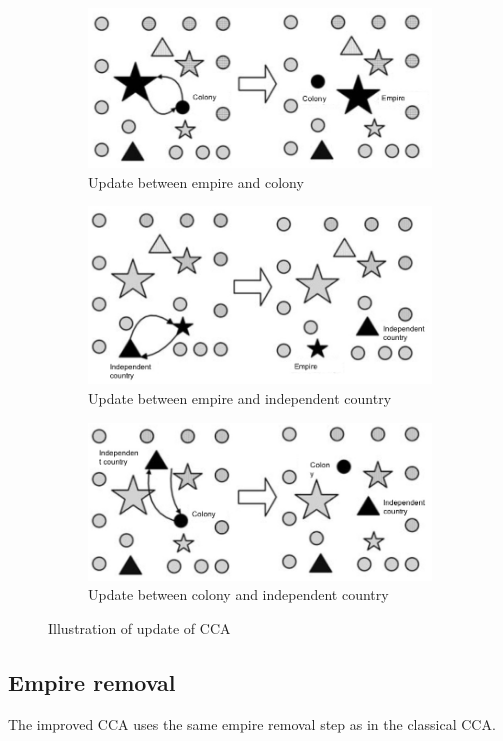 \begin{figure}[h!]
	\centering
	\begin{subfigure}[b]{0.8\linewidth}
		\includegraphics[width=\linewidth]{sections/figure4a.jpg}
		\caption{Update between empire and colony}
		\label{fig:fig4a}
	\end{subfigure}
	\begin{subfigure}[b]{0.8\linewidth}
		\includegraphics[width=\linewidth]{sections/figure4b.jpg}
		\caption{Update between empire and independent country}
		\label{fig:fig4b}
	\end{subfigure}
	\begin{subfigure}[b]{0.8\linewidth}
		\includegraphics[width=\linewidth]{sections/figure4c.jpg}
		\caption{Update between colony and independent country}
		\label{fig:fig4c}
	\end{subfigure}
	\caption{Illustration of update of CCA}
	\label{fig:fig4}
\end{figure}

\subsection{Empire removal}
The improved CCA uses the same empire removal step as in the classical CCA.